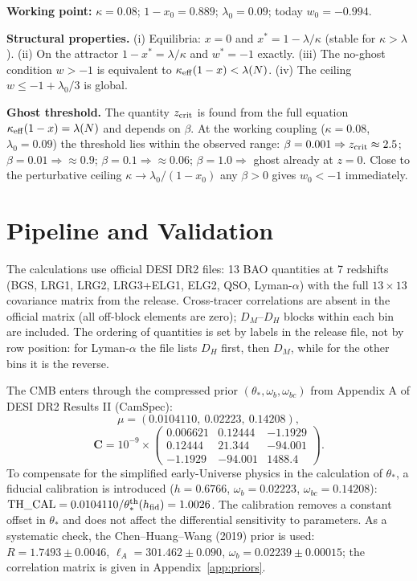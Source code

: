 \documentclass[11pt,a4paper]{article}
\begin{document}
\textbf{Working point:} $\kappa=0.08$; $1-x_0=0.889$; $\lambda_0=0.09$; today $w_0=-0.994$.

\textbf{Structural properties.} (i) Equilibria: $x=0$ and $x^*=1-\lambda/\kappa$ (stable for $\kappa>\lambda$). (ii) On the attractor $1-x^*=\lambda/\kappa$ and $w^*=-1$ exactly. (iii) The no-ghost condition $w>-1$ is equivalent to $\kappa_{\rm eff}(1-x)<\lambda(N)$. (iv) The ceiling $w\le-1+\lambda_0/3$ is global.

\textbf{Ghost threshold.} The quantity $z_{\rm crit}$ is found from the full equation $\kappa_{\rm eff}(1-x)=\lambda(N)$ and depends on $\beta$. At the working coupling ($\kappa=0.08$, $\lambda_0=0.09$) the threshold lies within the observed range: $\beta=0.001\Rightarrow z_{\rm crit}\approx2.5$; $\beta=0.01\Rightarrow\approx0.9$; $\beta=0.1\Rightarrow\approx0.06$; $\beta=1.0\Rightarrow$ ghost already at $z=0$. Close to the perturbative ceiling $\kappa\to\lambda_0/(1-x_0)$ any $\beta>0$ gives $w_0<-1$ immediately.

\section{Pipeline and Validation}
The calculations use official DESI DR2 files: 13 BAO quantities at 7 redshifts (BGS, LRG1, LRG2, LRG3+ELG1, ELG2, QSO, Lyman-$\alpha$) with the full $13\times13$ covariance matrix from the release. Cross-tracer correlations are absent in the official matrix (all off-block elements are zero); $D_M$--$D_H$ blocks within each bin are included. The ordering of quantities is set by labels in the release file, not by row position: for Lyman-$\alpha$ the file lists $D_H$ first, then $D_M$, while for the other bins it is the reverse.

The CMB enters through the compressed prior $(\theta_*,\omega_b,\omega_{bc})$ from Appendix A of DESI DR2 Results II (CamSpec):
\[
\mu=(0.0104110,\ 0.02223,\ 0.14208),
\]
\[
\mathbf{C}=10^{-9}\times\begin{pmatrix}
0.006621 & 0.12444 & -1.1929\\
0.12444 & 21.344 & -94.001\\
-1.1929 & -94.001 & 1488.4
\end{pmatrix}.
\]
To compensate for the simplified early-Universe physics in the calculation of $\theta_*$, a fiducial calibration is introduced ($h=0.6766$, $\omega_b=0.02223$, $\omega_{bc}=0.14208$): $\mathrm{TH\_CAL}=0.0104110/\theta_*^{\rm th}(h_{\rm fid})=1.0026$. The calibration removes a constant offset in $\theta_*$ and does not affect the differential sensitivity to parameters. As a systematic check, the Chen--Huang--Wang (2019) prior is used: $R=1.7493\pm0.0046$, $\ell_A=301.462\pm0.090$, $\omega_b=0.02239\pm0.00015$; the correlation matrix is given in Appendix~\ref{app:priors}.
\end{document}
